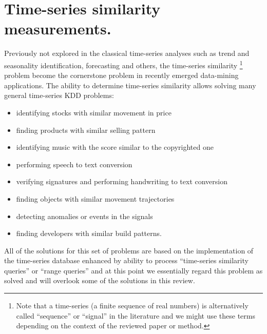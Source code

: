 \chapter{Time-series similarity measurements.}
Previously not explored in the classical time-series analyses such as trend and seasonality identification, forecasting and others, the time-series similarity \footnote{Note that a time-series (a finite sequence of real numbers) is alternatively called ``sequence'' or ``signal'' in the literature and we might use these terms depending on the context of the reviewed paper or method.}  problem become the cornerstone problem in recently emerged data-mining applications. The ability to determine time-series similarity allows solving many general time-series KDD problems:
\begin{itemize}
	\item identifying stocks with similar movement in price \cite{citeulike:4384535} \cite{citeulike:4031865} \cite{citeulike:4025073}
	\item finding products with similar selling pattern \cite{citeulike:4326324}
	\item identifying music with the score similar to the copyrighted one \cite{citeulike:3821484} \cite{citeulike:3815076}
	\item performing speech to text conversion \cite{citeulike:3728228}
	\item verifying signatures and performing handwriting to text conversion \cite{citeulike:3733947} \cite{citeulike:3513035}
	\item finding objects with similar movement trajectories \cite{citeulike:964832} \cite{citeulike:3728229} \cite{citeulike:3815864}
	\item detecting anomalies or events in the signals \cite{citeulike:4412621} \cite{citeulike:4412617}
	\item finding developers with similar build patterns.
\end{itemize}

All of the solutions for this set of problems are based on the implementation of the time-series database enhanced by ability to process ``time-series similarity queries'' or ``range queries'' and at this point we essentially regard this problem as solved and will overlook some of the solutions in this review. 

